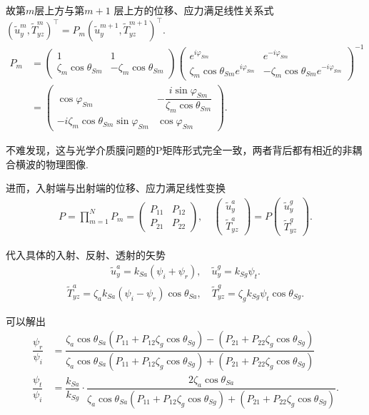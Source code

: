 故第\(m\)层上方与第\(m + 1\) 层上方的位移、应力满足线性关系式
\(\left( \tilde{u}_y^m, \tilde{T}_{yz}^m \right)^\top = P_m \left( \tilde{u}_y^{m+1}, \tilde{T}_{yz}^{m+1} \right)^\top.\)
\begin{align*}
	P_m &=
	\begin{pmatrix} 1 & 1 \\ \zeta_m \cos\theta_{Sm} & -\zeta_m \cos\theta_{Sm} \end{pmatrix}
	\begin{pmatrix} e^{i\varphi_{Sm}} & e^{-i\varphi_{Sm}} \\ \zeta_m \cos\theta_{Sm} e^{i\varphi_{Sm}} & -\zeta_m \cos\theta_{Sm} e^{-i\varphi_{Sm}} \end{pmatrix}^{-1} \\&=
	\begin{pmatrix} \cos\varphi_{Sm} & -\dfrac{i \sin\varphi_{Sm}}{\zeta_m \cos\theta_{Sm}} \\ -i \zeta_m \cos\theta_{Sm} \sin\varphi_{Sm} & \cos\varphi_{Sm} \end{pmatrix}.
\end{align*}

不难发现，这与光学介质膜问题的P矩阵形式完全一致，两者背后都有相近的非耦合横波的物理图像.

进而，入射端与出射端的位移、应力满足线性变换
\begin{align*}
	P = \prod_{m=1}^N P_m = \begin{pmatrix} P_{11} & P_{12} \\ P_{21} & P_{22} \end{pmatrix}, \quad
	\begin{pmatrix} \tilde{u}_y^a \\ \tilde{T}_{yz}^a \end{pmatrix} = P \begin{pmatrix} \tilde{u}_y^g \\ \tilde{T}_{yz}^g \end{pmatrix}.
\end{align*}

代入具体的入射、反射、透射的矢势
\begin{align*}
	\tilde{u}_y^a = k_{Sa} (\psi_i + \psi_r), \quad \tilde{u}_y^g = k_{Sg} \psi_t.
\end{align*}
\begin{align*}
	\tilde{T}_{yz}^a = \zeta_a k_{Sa} (\psi_i - \psi_r) \cos\theta_{Sa}, \quad \tilde{T}_{yz}^g = \zeta_g k_{Sg} \psi_t \cos\theta_{Sg}.
\end{align*}

可以解出
\begin{align*}
	\dfrac{\psi_r}{\psi_i} &= \dfrac{\zeta_a \cos\theta_{Sa} (P_{11} + P_{12} \zeta_g \cos\theta_{Sg}) - (P_{21} + P_{22} \zeta_g \cos\theta_{Sg})}{\zeta_a \cos\theta_{Sa} (P_{11} + P_{12} \zeta_g \cos\theta_{Sg}) + (P_{21} + P_{22} \zeta_g \cos\theta_{Sg})}\\
	\dfrac{\psi_t}{\psi_i} &= \dfrac{k_{Sa}}{k_{Sg}} \cdot \dfrac{2 \zeta_a \cos\theta_{Sa}}{\zeta_a \cos\theta_{Sa} (P_{11} + P_{12} \zeta_g \cos\theta_{Sg}) + (P_{21} + P_{22} \zeta_g \cos\theta_{Sg})}.
\end{align*}

